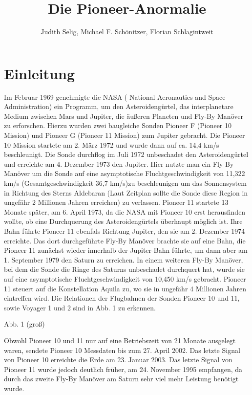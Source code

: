 \documentclass[a4paper,10pt]{article}
\title{Die Pioneer-Anormalie}
\author{Judith Selig, Michael F. Schönitzer, Florian Schlagintweit}
\begin{document}
\maketitle

% 

\section{Einleitung}
Im Februar 1969 genehmigte die NASA ( National Aeronautics and Space Administration) ein Programm, um den
Asteroidengürtel, das interplanetare Medium zwischen Mars und Jupiter, die äußeren Planeten und Fly-By Manöver zu
erforschen. Hierzu wurden zwei baugleiche Sonden Pioneer F (Pioneer 10 Mission) und Pioneer G (Pioneer 11 Mission) zum
Jupiter gebracht. Die Pioneer 10 Mission startete am 2. März 1972 und wurde dann auf ca. 14,4 km/s beschleunigt. Die
Sonde durchflog im Juli 1972 unbeschadet den Asteroidengürtel und erreichte am 4. Dezember 1973 den Jupiter. Hier nutzte
man ein Fly-By Manöver um die Sonde auf eine asymptotische Fluchtgeschwindigkeit von 11,322 km/s (Gesamtgeschwindigkeit
36,7 km/s)zu beschleunigen um das Sonnensystem in Richtung des Sterns Aldebaran (Laut Zeitplan sollte die Sonde diese
Region in ungefähr 2 Millionen Jahren erreichen\cite{Nieto2004}) zu verlassen. Pioneer 11 startete 13 Monate später, am
6. April 1973, da die NASA mit Pioneer 10 erst herausfinden wollte, ob eine Durchquerung des Asteroidengürtels überhaupt
möglich ist. Ihre Bahn führte Pioneer 11 ebenfals Richtung Jupiter, den sie am 2. Dezember 1974 erreichte. Das dort
durchgeführte Fly-By Manöver brachte sie auf eine Bahn, die Pioneer 11 zunächst wieder innerhalb der Jupiter-Bahn
führte, um dann aber am 1. September 1979 den Saturn zu erreichen. In einem weiteren Fly-By Manöver, bei dem die Sonde
die Ringe des Saturns unbeschadet durchquert hat, wurde sie auf eine asymptotische Fluchtgeschwindigkeit von 10,450 km/s
gebracht. Pioneer 11 steuert auf die Konstellation Aquila zu, wo sie in ungefähr 4 Millionen Jahren eintreffen wird. Die
Relationen der Flugbahnen der Sonden Pioneer 10 und 11, sowie Voyager 1 und 2 sind in Abb. 1 zu erkennen.

Abb. 1 (groß)

Obwohl Pioneer 10 und 11 nur auf eine Betriebszeit von 21 Monate ausgelegt waren, sendete Pioneer 10 Messdaten bis zum
27. April 2002. Das letzte Signal von Pioneer 10 erreichte die Erde am 23. Januar 2003. Das letzte Signal von Pioneer 11
wurde jedoch deutlich früher, am 24. November 1995 empfangen, da durch das zweite Fly-By Manöver am Saturn sehr viel
mehr Leistung benötigt wurde.
\end{document}
